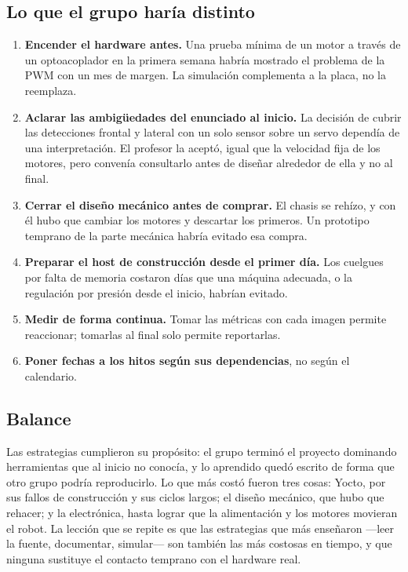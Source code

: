\documentclass[11pt,a4paper]{article}
\begin{document}
\subsection{Lo que el grupo haría distinto}

\begin{enumerate}
  \item \textbf{Encender el hardware antes.} Una prueba mínima de un motor a
        través de un optoacoplador en la primera semana habría mostrado el
        problema de la PWM con un mes de margen. La simulación complementa a
        la placa, no la reemplaza.
  \item \textbf{Aclarar las ambigüedades del enunciado al inicio.} La
        decisión de cubrir las detecciones frontal y lateral con un solo
        sensor sobre un servo dependía de una interpretación. El profesor la
        aceptó, igual que la velocidad fija de los motores, pero convenía
        consultarlo antes de diseñar alrededor de ella y no al final.
  \item \textbf{Cerrar el diseño mecánico antes de comprar.} El chasis se
        rehízo, y con él hubo que cambiar los motores y descartar los
        primeros. Un prototipo temprano de la parte mecánica habría evitado
        esa compra.
  \item \textbf{Preparar el host de construcción desde el primer día.} Los
        cuelgues por falta de memoria costaron días que una máquina adecuada,
        o la regulación por presión desde el inicio, habrían evitado.
  \item \textbf{Medir de forma continua.} Tomar las métricas con cada imagen
        permite reaccionar; tomarlas al final solo permite reportarlas.
  \item \textbf{Poner fechas a los hitos según sus dependencias}, no según
        el calendario.
\end{enumerate}

\subsection{Balance}

Las estrategias cumplieron su propósito: el grupo terminó el proyecto
dominando herramientas que al inicio no conocía, y lo aprendido quedó escrito
de forma que otro grupo podría reproducirlo. Lo que más costó fueron tres
cosas: Yocto, por sus fallos de construcción y sus ciclos largos; el diseño
mecánico, que hubo que rehacer; y la electrónica, hasta lograr que la
alimentación y los motores movieran el robot. La lección que se repite es que
las estrategias que más enseñaron ---leer la fuente, documentar, simular---
son también las más costosas en tiempo, y que ninguna sustituye el contacto
temprano con el hardware real.
\end{document}
